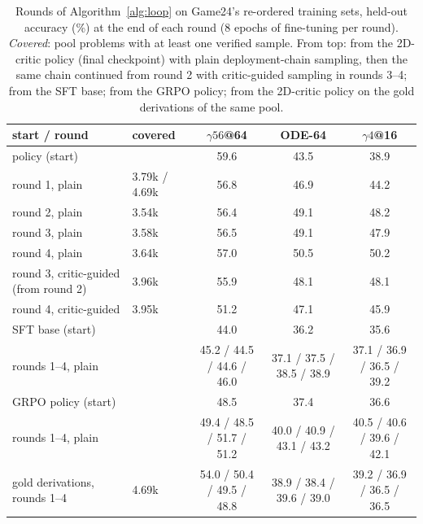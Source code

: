 \begin{table}[H]\centering\small
\caption{Rounds of Algorithm~\ref{alg:loop} on Game24's re-ordered training sets, held-out accuracy (\%) at the end of each round (8 epochs of fine-tuning per round). \emph{Covered}: pool problems with at least one verified sample. From top: from the 2D-critic policy (final checkpoint) with plain deployment-chain sampling, then the same chain continued from round 2 with critic-guided sampling in rounds 3--4; from the SFT base; from the GRPO policy; from the 2D-critic policy on the gold derivations of the same pool.}\label{tab:g24_loop}
\scriptsize\setlength{\tabcolsep}{4pt}
\begin{tabular}{@{}llccc@{}}\toprule
start / round & covered & $\gamma56$@64 & ODE-64 & $\gamma4$@16\\\midrule
\methodSVGTwoD{} policy (start) & & 59.6 & 43.5 & 38.9\\
round 1, plain & 3.79k / 4.69k & 56.8 & 46.9 & 44.2\\
round 2, plain & 3.54k & 56.4 & 49.1 & 48.2\\
round 3, plain & 3.58k & 56.5 & 49.1 & 47.9\\
round 4, plain & 3.64k & 57.0 & 50.5 & 50.2\\
round 3, critic-guided (from round 2) & 3.96k & 55.9 & 48.1 & 48.1\\
round 4, critic-guided & 3.95k & 51.2 & 47.1 & 45.9\\\midrule
SFT base (start) & & 44.0 & 36.2 & 35.6\\
rounds 1--4, plain & & 45.2 / 44.5 / 44.6 / 46.0 & 37.1 / 37.5 / 38.5 / 38.9 & 37.1 / 36.9 / 36.5 / 39.2\\\midrule
GRPO policy (start) & & 48.5 & 37.4 & 36.6\\
rounds 1--4, plain & & 49.4 / 48.5 / 51.7 / 51.2 & 40.0 / 40.9 / 43.1 / 43.2 & 40.5 / 40.6 / 39.6 / 42.1\\\midrule
gold derivations, rounds 1--4 & 4.69k & 54.0 / 50.4 / 49.5 / 48.8 & 38.9 / 38.4 / 39.6 / 39.0 & 39.2 / 36.9 / 36.5 / 36.5\\
\bottomrule\end{tabular}\end{table}

\fi


\iffalse
